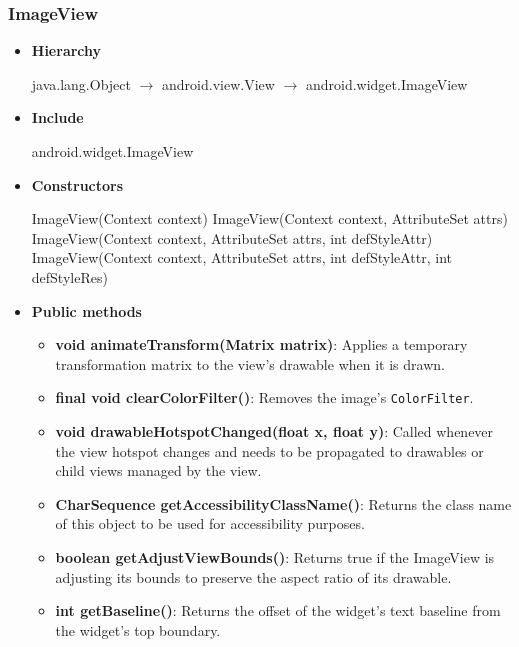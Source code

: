 \documentclass{report}
\begin{document}
    \subsubsection{ImageView}
    \begin{itemize}
         \item \textbf{Hierarchy} 
             \begin{center}
                 java.lang.Object $\to$	android.view.View $\to$	android.widget.ImageView
             \end{center}
        \item \textbf{Include}
            \bigbreak \noindent 
            \begin{javacode}
                android.widget.ImageView
            \end{javacode}
        \item \textbf{Constructors}
            \bigbreak \noindent 
            \begin{javacode}
                ImageView(Context context)
                ImageView(Context context, AttributeSet attrs)
                ImageView(Context context, AttributeSet attrs, int defStyleAttr)
                ImageView(Context context, AttributeSet attrs, int defStyleAttr, int defStyleRes)
            \end{javacode}
        \item \textbf{Public methods}
            \begin{itemize}
                \item \textbf{void animateTransform(Matrix matrix)}: Applies a temporary transformation matrix to the view's drawable when it is drawn.
                \item \textbf{final void clearColorFilter()}: Removes the image's \texttt{ColorFilter}.
                \item \textbf{void drawableHotspotChanged(float x, float y)}: Called whenever the view hotspot changes and needs to be propagated to drawables or child views managed by the view.
                \item \textbf{CharSequence getAccessibilityClassName()}: Returns the class name of this object to be used for accessibility purposes.
                \item \textbf{boolean getAdjustViewBounds()}: Returns true if the ImageView is adjusting its bounds to preserve the aspect ratio of its drawable.
                \item \textbf{int getBaseline()}: Returns the offset of the widget's text baseline from the widget's top boundary.

\end{itemize}
\end{itemize}
\end{document}
